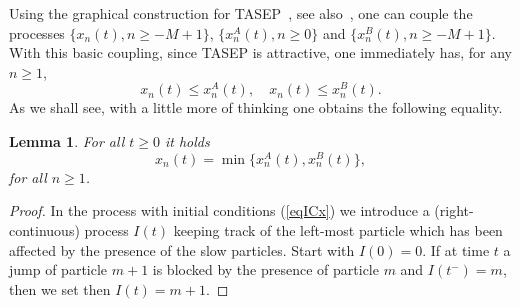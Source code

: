 \documentclass[12pt,a4paper]{article}
\numberwithin{equation}{section}
\newtheorem{lem}[prop]{Lemma}
\begin{document}
Using the graphical construction for TASEP~\cite{Lig76,Har78}, see also~\cite{Li99}, one can couple the processes $\{x_n(t),n\geq -M+1\}$, $\{x^A_n(t),n\geq 0\}$ and $\{x^B_n(t),n\geq -M+1\}$. With this basic coupling, since TASEP is attractive, one immediately has, for any $n\geq 1$,
\begin{equation}
x_n(t)\leq x_n^A(t),\quad x_n(t)\leq x_n^B(t).
\end{equation}
As we shall see, with  a little more of thinking one obtains the following equality.
\begin{lem}\label{lemMinimum}
For all $t\geq 0$ it holds
\begin{equation}\label{eqMinimum}
x_n(t)=\min\{x_n^A(t),x_n^B(t)\},
\end{equation}
for all $n\geq 1$.
\end{lem}
\begin{proof}
In the process with initial conditions (\ref{eqICx}) we introduce a (right-continuous) process $I(t)$ keeping track of the left-most particle which has been affected by the presence of the slow particles. Start with $I(0)=0$. If at time $t$ a jump of particle $m+1$ is blocked by the presence of particle $m$ and $I(t^-)=m$, then we set then $I(t)=m+1$.


\end{proof}
\end{document}

